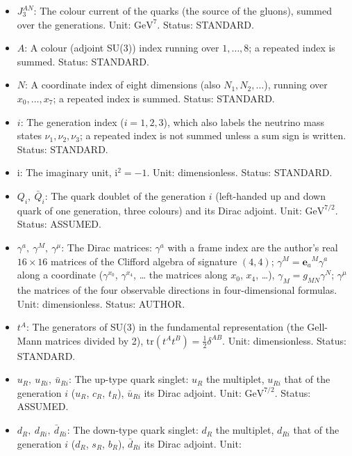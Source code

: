 \documentclass[
  10pt,
]{article}
\providecommand{\tightlist}{%
  \setlength{\itemsep}{0pt}\setlength{\parskip}{0pt}}
\begin{document}
\begin{itemize}
\tightlist
\item
  \(J_3^{AN}\): The colour current of the quarks (the source of the
  gluons), summed over the generations. Unit: \(\mathrm{GeV}^{7}\).
  Status: STANDARD.
\item
  \(A\): A colour (adjoint SU(3)) index running over \(1, \dots, 8\); a
  repeated index is summed. Status: STANDARD.
\item
  \(N\): A coordinate index of eight dimensions (also
  \(N_1, N_2, \dots\)), running over \(x_0, \dots, x_7\); a repeated
  index is summed. Status: STANDARD.
\item
  \(i\): The generation index (\(i = 1, 2, 3\)), which also labels the
  neutrino mass states \(\nu_1, \nu_2, \nu_3\); a repeated index is not
  summed unless a sum sign is written. Status: STANDARD.
\item
  \(\mathrm{i}\): The imaginary unit, \(\mathrm{i}^2 = -1\). Unit:
  dimensionless. Status: STANDARD.
\item
  \(Q_i,\ \bar Q_i\): The quark doublet of the generation \(i\)
  (left-handed up and down quark of one generation, three colours) and
  its Dirac adjoint. Unit: \(\mathrm{GeV}^{7/2}\). Status: ASSUMED.
\item
  \(\gamma^a,\ \gamma^M,\ \gamma^\mu\): The Dirac matrices: \(\gamma^a\)
  with a frame index are the author's real \(16 \times 16\) matrices of
  the Clifford algebra of signature \((4, 4)\);
  \(\gamma^M = \mathbf{e}_a{}^M\gamma^a\) along a coordinate
  (\(\gamma^{x_0}\), \(\gamma^{x_4}\), \ldots{} the matrices along
  \(x_0\), \(x_4\), \ldots), \(\gamma_M = g_{MN}\gamma^N\);
  \(\gamma^\mu\) the matrices of the four observable directions in
  four-dimensional formulas. Unit: dimensionless. Status: AUTHOR.
\item
  \(t^A\): The generators of SU(3) in the fundamental representation
  (the Gell-Mann matrices divided by 2),
  \(\mathrm{tr}(t^At^B) = \frac12\delta^{AB}\). Unit: dimensionless.
  Status: STANDARD.
\item
  \(u_R,\ u_{Ri},\ \bar u_{Ri}\): The up-type quark singlet: \(u_R\) the
  multiplet, \(u_{Ri}\) that of the generation \(i\) (\(u_R\), \(c_R\),
  \(t_R\)), \(\bar u_{Ri}\) its Dirac adjoint. Unit:
  \(\mathrm{GeV}^{7/2}\). Status: ASSUMED.
\item
  \(d_R,\ d_{Ri},\ \bar d_{Ri}\): The down-type quark singlet: \(d_R\)
  the multiplet, \(d_{Ri}\) that of the generation \(i\) (\(d_R\),
  \(s_R\), \(b_R\)), \(\bar d_{Ri}\) its Dirac adjoint. Unit:

\end{itemize}
\end{document}

